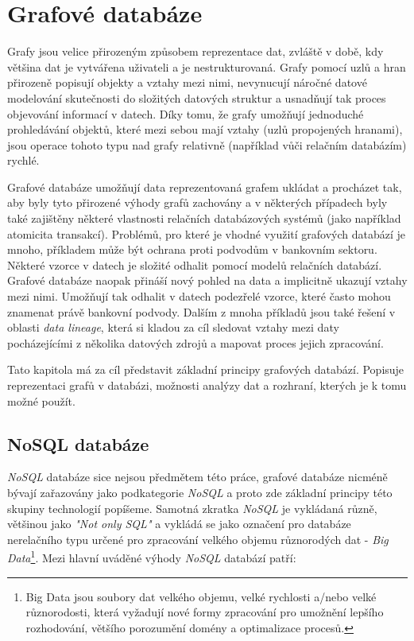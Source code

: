 \chapter{Grafové databáze}
\label{sec:gdb}

Grafy jsou velice přirozeným způsobem reprezentace dat, zvláště v době, kdy většina dat je vytvářena uživateli a je nestrukturovaná. Grafy pomocí uzlů a hran přirozeně popisují objekty a vztahy mezi nimi, nevynucují náročné datové modelování skutečnosti do složitých datových struktur a usnadňují tak proces objevování informací v datech. Díky tomu, že grafy umožňují jednoduché prohledávání objektů, které mezi sebou mají vztahy (uzlů propojených hranami), jsou operace tohoto typu nad grafy relativně (například vůči relačním databázím) rychlé.

Grafové databáze umožňují data reprezentovaná grafem ukládat a procházet tak, aby byly tyto přirozené výhody grafů zachovány a v některých případech byly také zajištěny některé vlastnosti relačních databázových systémů (jako například atomicita transakcí). Problémů, pro které je vhodné využití grafových databází je mnoho, příkladem může být ochrana proti podvodům v bankovním sektoru. Některé vzorce v datech je složité odhalit pomocí modelů relačních databází. Grafové databáze naopak přináší nový pohled na data a implicitně ukazují vztahy mezi nimi. Umožňují tak odhalit v datech podezřelé vzorce, které často mohou znamenat právě bankovní podvody.\cite{Webber17} Dalším z mnoha příkladů jsou také řešení v oblasti \textit{data lineage}, která si kladou za cíl sledovat vztahy mezi daty pocházejícími z několika datových zdrojů a mapovat proces jejich zpracování.

Tato kapitola má za cíl představit základní principy grafových databází. Popisuje reprezentaci grafů v databázi, možnosti analýzy dat a rozhraní, kterých je k tomu možné použít.

\section{NoSQL databáze}
\label{sec:gdb-nosql}
\textit{NoSQL} databáze sice nejsou předmětem této práce, grafové databáze nicméně bývají zařazovány jako podkategorie \textit{NoSQL} a proto zde základní principy této skupiny technologií popíšeme. Samotná zkratka \textit{NoSQL} je vykládaná různě, většinou jako \textit{"Not only SQL"} \cite{Evans09} a vykládá se jako označení pro databáze nerelačního typu určené pro zpracování velkého objemu různorodých dat - \textit{Big Data}\footnote{Big Data jsou soubory dat velkého objemu, velké rychlosti a/nebo velké různorodosti, která vyžadují nové formy zpracování pro umožnění lepšího rozhodování, většího porozumění domény a optimalizace procesů.\cite{Laney01}}. Mezi hlavní uváděné výhody \textit{NoSQL} databází patří:

